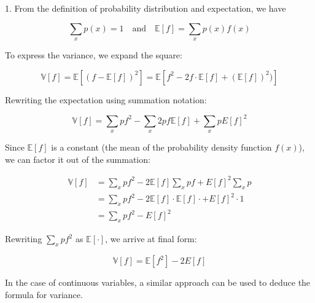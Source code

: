 1. From the definition of probability distribution and expectation, we have

\[
    \sum_{x}{p(x)} = 1 \quad \text{and} \quad \mathbb{E}[f] = \sum_{x}{p(x)f(x)}
\]

To express the variance, we expand the square:

\[
    \mathbb{V}[f]
    = \mathbb{E}[(f - \mathbb{E}[f])^2]
    = \mathbb{E}[f^2 - 2f \cdot \mathbb{E}[f] + (\mathbb{E}[f])^2)]
\]

Rewriting the expectation using summation notation:

\[
    \mathbb{V}[f]
    = \sum_{x}{pf^2} - \sum_{x}{2pf\mathbb{E}[f]} + \sum_{x}{pE[f]^2}
\]

Since $\mathbb{E}[f]$ is a constant (the mean of the probability density function $f(x)$), we can factor it out of the summation:

\begin{align*}
    \mathbb{V}[f]
    &= \sum_{x}{pf^2} - 2\mathbb{E}[f]\sum_{x}{pf} + E[f]^2\sum_{x}{p} \\
    &= \sum_{x}{pf^2} - 2\mathbb{E}[f] \cdot \mathbb{E}[f] \cdot + E[f]^2 \cdot 1 \\
    &= \sum_{x}{pf^2} - E[f]^2
\end{align*}

Rewriting $\sum_{x}{pf^2}$ as $\mathbb{E}[\cdot]$, we arrive at final form:

\[
    \mathbb{V}[f] = \mathbb{E}[f^2] - 2E[f]
\]

In the case of continuous variables, a similar approach can be used to deduce the formula for variance.

